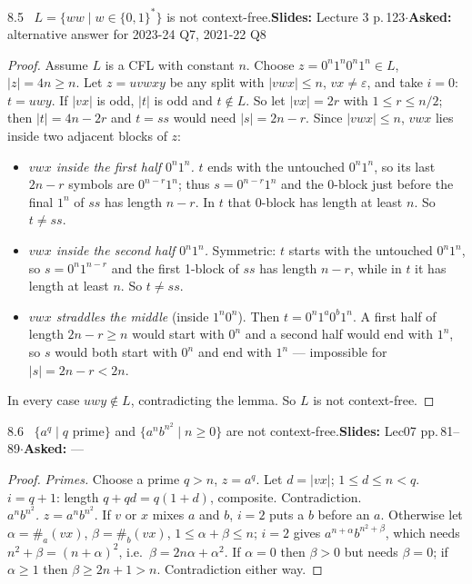 \documentclass[10.5pt,a4paper]{article}
\newcommand{\src}[2]{{\footnotesize\color{gray!70!black}\textbf{Slides:} #1\enspace$\cdot$\enspace\textbf{Asked:} #2}\par}
\newcommand{\eps}{\varepsilon}
\begin{document}
\begin{thm}{8.5 \ $L=\{ww\mid w\in\{0,1\}^*\}$ is not context-free.}\src{Lecture 3 p.\,123}{alternative answer for 2023-24 Q7, 2021-22 Q8}\end{thm}
\begin{proof}
Assume $L$ is a CFL with constant $n$. Choose $z=0^n1^n0^n1^n\in L$, $|z|=4n\ge n$. Let $z=uvwxy$ be any split with $|vwx|\le n$, $vx\ne\eps$,
and take $i=0$: $t=uwy$. If $|vx|$ is odd, $|t|$ is odd and $t\notin L$. So let $|vx|=2r$ with $1\le r\le n/2$; then $|t|=4n-2r$ and $t=ss$
would need $|s|=2n-r$. Since $|vwx|\le n$, $vwx$ lies inside two adjacent blocks of $z$:
\begin{itemize}
\item \emph{$vwx$ inside the first half $0^n1^n$.} $t$ ends with the untouched $0^n1^n$, so its last $2n-r$ symbols are $0^{n-r}1^n$; thus
$s=0^{n-r}1^n$ and the 0-block just before the final $1^n$ of $ss$ has length $n-r$. In $t$ that 0-block has length at least $n$. So $t\ne ss$.
\item \emph{$vwx$ inside the second half $0^n1^n$.} Symmetric: $t$ starts with the untouched $0^n1^n$, so $s=0^n1^{n-r}$ and the first 1-block of
$ss$ has length $n-r$, while in $t$ it has length at least $n$. So $t\ne ss$.
\item \emph{$vwx$ straddles the middle} (inside $1^n0^n$). Then $t=0^n1^a0^b1^n$. A first half of length $2n-r\ge n$ would start with $0^n$
and a second half would end with $1^n$, so $s$ would both start with $0^n$ and end with $1^n$ --- impossible for $|s|=2n-r<2n$.
\end{itemize}
In every case $uwy\notin L$, contradicting the lemma. So $L$ is not context-free.
\end{proof}

\begin{thm}{8.6 \ $\{a^q\mid q \text{ prime}\}$ and $\{a^nb^{n^2}\mid n\ge0\}$ are not context-free.}\src{Lec07 pp.\,81--89}{---}\end{thm}
\begin{proof}
\emph{Primes.} Choose a prime $q>n$, $z=a^q$. Let $d=|vx|$; $1\le d\le n<q$. $i=q+1$: length $q+qd=q(1+d)$, composite. Contradiction.\\
\emph{$a^nb^{n^2}$.} $z=a^nb^{n^2}$. If $v$ or $x$ mixes $a$ and $b$, $i=2$ puts a $b$ before an $a$. Otherwise let $\alpha=\#_a(vx)$,
$\beta=\#_b(vx)$, $1\le\alpha+\beta\le n$; $i=2$ gives $a^{n+\alpha}b^{n^2+\beta}$, which needs $n^2+\beta=(n+\alpha)^2$, i.e.\
$\beta=2n\alpha+\alpha^2$. If $\alpha=0$ then $\beta>0$ but needs $\beta=0$; if $\alpha\ge1$ then $\beta\ge2n+1>n$. Contradiction either way.
\end{proof}
\end{document}
